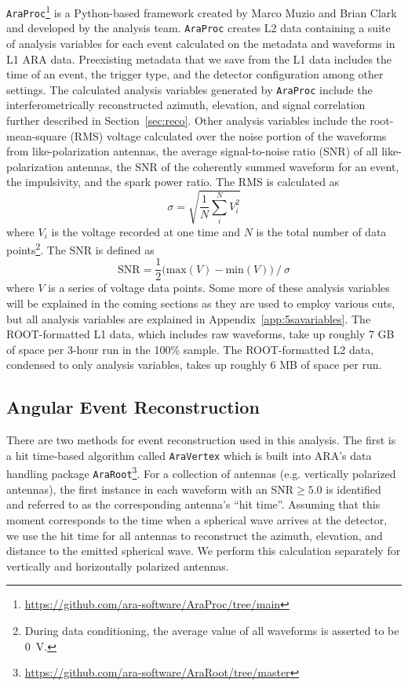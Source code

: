   \texttt{AraProc}\footnote{\url{https://github.com/ara-software/AraProc/tree/main}} is a Python-based framework created by Marco Muzio and Brian Clark and developed by the analysis team.
  \texttt{AraProc} creates L2 data containing a suite of analysis variables for each event calculated on the metadata and waveforms in L1 ARA data.
  Preexisting metadata that we save from the L1 data includes the time of an event, the trigger type, and the detector configuration among other settings. 
  The calculated analysis variables generated by \texttt{AraProc} include the interferometrically reconstructed azimuth, elevation, and signal correlation further described in Section~\ref{sec:reco}. 
  Other analysis variables include the root-mean-square (RMS) voltage calculated over the noise portion of the waveforms from like-polarization antennas, the average signal-to-noise ratio (SNR) of all like-polarization antennas, the SNR of the coherently summed waveform for an event, the impulsivity, and the spark power ratio. 
  The RMS is calculated as
  \begin{equation}
    \sigma = \sqrt{ \frac{1}{N} \sum_i^N V_i^2}
  \end{equation}
  where $V_i$ is the voltage recorded at one time and $N$ is the total number of data points\footnote{During data conditioning, the average value of all waveforms is asserted to be 0~V.}.
  The SNR is defined as 
  \begin{equation}
    \text{SNR} = \frac{1}{2} \big( \text{max}(V) - \text{min}(V) \big) ~/~ \sigma 
    \label{eq:snr}
  \end{equation}
  where $V$ is a series of voltage data points.
  Some more of these analysis variables will be explained in the coming sections as they are used to employ various cuts, but all analysis variables are explained in Appendix~\ref{app:5savariables}.
  The ROOT-formatted L1 data, which includes raw waveforms, take up roughly 7 GB of space per 3-hour run in the 100\% sample. 
  The ROOT-formatted L2 data, condensed to only analysis variables, takes up roughly 6 MB of space per run. 

  \subsection{Angular Event Reconstruction\label{sec:reco}}

    There are two methods for event reconstruction used in this analysis. 
    The first is a hit time-based algorithm called \texttt{AraVertex} which is built into ARA's data handling package \texttt{AraRoot}\footnote{\url{https://github.com/ara-software/AraRoot/tree/master}}.
    For a collection of antennas (e.g. vertically polarized antennas), the first instance in each waveform with an SNR$\geq 5.0$ is identified and referred to as the corresponding antenna's ``hit time''. 
    Assuming that this moment corresponds to the time when a spherical wave arrives at the detector, we use the hit time for all antennas to reconstruct the azimuth, elevation, and distance to the emitted spherical wave. 
    We perform this calculation separately for vertically and horizontally polarized antennas. 
  
